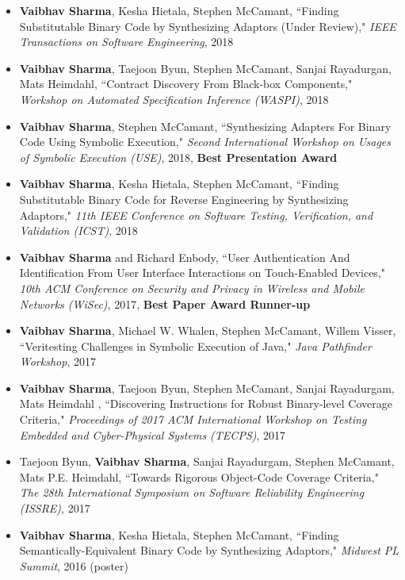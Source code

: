 \documentclass[letterpaper,10pt]{article}
\begin{document}
\begin{itemize}
\item
{\bf Vaibhav Sharma}, Kesha Hietala, Stephen McCamant, ``Finding
		Substitutable Binary Code by Synthesizing Adaptors (Under Review),"
		\textit{IEEE Transactions on Software Engineering}, 2018
\item
{\bf Vaibhav Sharma}, Taejoon Byun, Stephen McCamant, Sanjai Rayadurgan, Mats Heimdahl, ``Contract Discovery From Black-box Components," \textit{Workshop on Automated Specification Inference (WASPI)}, 2018
\item
{\bf Vaibhav Sharma}, Stephen McCamant, ``Synthesizing Adapters For Binary Code Using Symbolic Execution," \textit{Second International Workshop on Usages of Symbolic Execution (USE)}, 2018, {\bf Best Presentation Award}
\item
{\bf Vaibhav Sharma}, Kesha Hietala, Stephen McCamant, ``Finding Substitutable Binary Code for Reverse Engineering by Synthesizing Adaptors," \textit{11th IEEE Conference on Software Testing, Verification, and Validation (ICST)}, 2018
\item
{\bf Vaibhav Sharma} and Richard Enbody, ``User Authentication And Identification From User Interface Interactions on Touch-Enabled Devices," \textit{10th ACM Conference on Security and Privacy in Wireless and Mobile Networks (WiSec)}, 2017, {\bf Best Paper Award Runner-up}
\item
{\bf Vaibhav Sharma}, Michael W. Whalen, Stephen McCamant, Willem Visser, ``Veritesting Challenges in Symbolic Execution of Java," \textit{Java Pathfinder Workshop}, 2017
\item
{\bf Vaibhav Sharma}, Taejoon Byun, Stephen McCamant, Sanjai Rayadurgam, Mats Heimdahl , ``Discovering Instructions for Robust Binary-level Coverage Criteria," \textit{Proceedings of 2017 ACM International Workshop on Testing Embedded and Cyber-Physical Systems (TECPS)}, 2017
\item
Taejoon Byun, {\bf Vaibhav Sharma}, Sanjai Rayadurgam, Stephen McCamant, Mats P.E. Heimdahl, ``Towards Rigorous Object-Code Coverage Criteria," \textit{The 28th International Symposium on Software Reliability Engineering (ISSRE)}, 2017
\item
{\bf Vaibhav Sharma}, Kesha Hietala, Stephen McCamant, ``Finding Semantically-Equivalent Binary Code by Synthesizing Adaptors," \textit{Midwest PL Summit}, 2016 (poster) 
\end{itemize}
\end{document}
